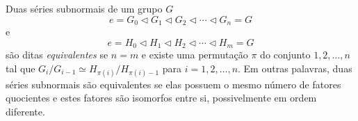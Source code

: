 \documentclass[11pt,openany]{book}
\begin{document}
\begin{definition}
\label{def:series_subnormais_equivalentes}
        Duas séries subnormais de um grupo $G$
        $$
        {e} = G_0 \triangleleft G_1 \triangleleft G_2 \triangleleft \cdots \triangleleft G_n = G
        $$
        e
        $$
        {e} = H_0 \triangleleft H_1 \triangleleft H_2 \triangleleft \cdots \triangleleft H_m = G
        $$
        são ditas \textit{equivalentes} se $n = m$ e existe uma permutação $\pi$ do conjunto ${1, 2, \ldots, n}$ tal que $G_i/G_{i-1} \simeq H_{\pi(i)}/H_{\pi(i)-1}$ para $i = 1, 2, \ldots, n$. Em outras palavras, duas séries subnormais são equivalentes se elas possuem o mesmo número de fatores quocientes e estes fatores são isomorfos entre si, possivelmente em ordem diferente.
\end{definition}
\end{document}
